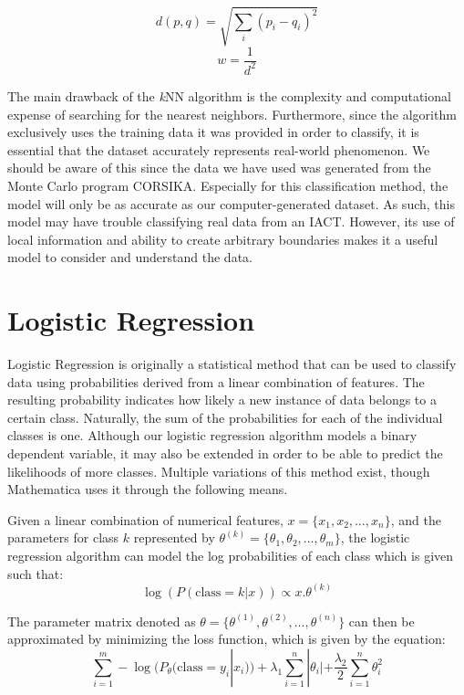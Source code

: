 \documentclass[a4paper, 12pt]{report}
\theoremstyle{definition}
\begin{document}
\begin{equation}
    d(p,q) = \sqrt{\sum_i(p_i - q_i)^2}
\end{equation}
\begin{equation}
    w = \frac{1}{d^2}
\end{equation}

The main drawback of the \textit{k}NN algorithm is the complexity and computational expense of searching for the nearest neighbors. Furthermore, since the algorithm exclusively uses the training data it was provided in order to classify, it is essential that the dataset accurately represents real-world phenomenon. We should be aware of this since the data we have used was generated from the Monte Carlo program CORSIKA. Especially for this classification method, the model will only be as accurate as our computer-generated dataset. As such, this model may have trouble classifying real data from an IACT. However, its use of local information and ability to create arbitrary boundaries makes it a useful model to consider and understand the data.

\section{Logistic Regression}

Logistic Regression is originally a statistical method that can be used to classify data using probabilities derived from a linear combination of features. The resulting probability indicates how likely a new instance of data belongs to a certain class. Naturally, the sum of the probabilities for each of the individual classes is one. Although our logistic regression algorithm models a binary dependent variable, it may also be extended in order to be able to predict the likelihoods of more classes. Multiple variations of this method exist, though Mathematica uses it through the following means.

Given a linear combination of numerical features, $x = \{x_1,x_2,\dots, x_n\}$, and the parameters for class $k$ represented by $\theta^{(k)} = \{\theta_1, \theta_2,\dots, \theta_m\}$, the logistic regression algorithm can model the log probabilities of each class which is given such that: 
\begin{equation}
        \log \left( P(\text{class}=k|x) \right) \propto x.\theta^{(k)}
\end{equation}

The parameter matrix denoted as $\theta = \{\theta^{(1)}, \theta^{(2)},\dots, \theta^{(n)}\}$ can then be approximated by minimizing the loss function, which is given by the equation:
\begin{equation}
\sum_{i=1}^m-\log(P_{\theta}(\text{class}=y_i|x_i))+\lambda_1 \sum_{i=1}^n |\theta_i|+\frac{\lambda_2}{2} \sum_{i=1}^n\theta_i^2    
\end{equation}
\end{document}
